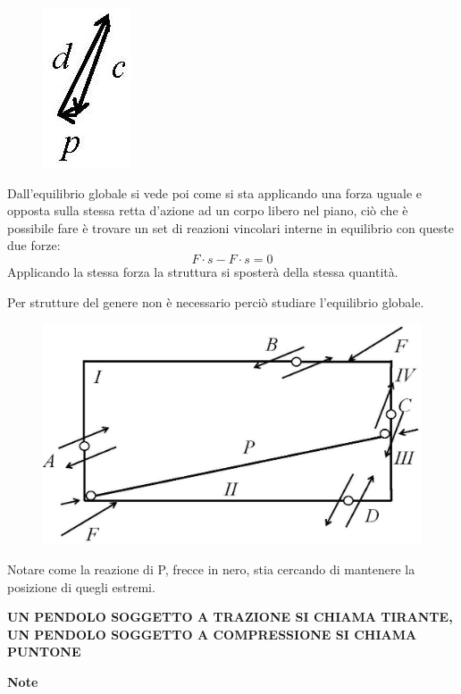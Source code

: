 \documentclass{article}
\begin{document}
\begin{adjustwidth}{2in}{}
\begin{figure}[H]
	\centering
	\includegraphics[width=0.06\linewidth]{immagini/1.PARTE4_Pagina_35.2}
\end{figure}

Dall'equilibrio globale si vede poi come si sta applicando una forza uguale e opposta sulla stessa retta d'azione ad un corpo libero nel piano, ciò che è possibile fare è trovare un set di reazioni vincolari interne in equilibrio  con queste due forze:
\[F\cdot s - F\cdot s = 0\]
Applicando la stessa forza la struttura si sposterà della stessa quantità. 

Per strutture del genere non è necessario perciò studiare l'equilibrio globale. 

\begin{figure}[H]
	\centering
	\includegraphics[width=0.5\linewidth]{immagini/1.PARTE4_Pagina_36}
\end{figure}

Notare come la reazione di P, frecce in nero, stia cercando di mantenere la posizione di quegli estremi. \newline

 \begin{center}
 	\textbf{UN PENDOLO SOGGETTO A TRAZIONE SI CHIAMA TIRANTE, UN PENDOLO SOGGETTO A COMPRESSIONE SI CHIAMA PUNTONE}
 \end{center}

 
	\newpage
	{\Large \textbf{Note}}
	
\end{adjustwidth}
\end{document}
